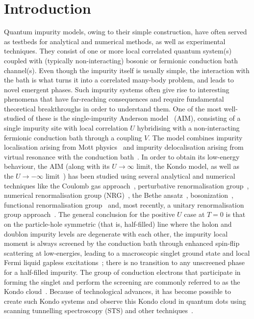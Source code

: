 \documentclass[reprint,superscriptaddress,floatfix]{revtex4-2}
\begin{document}

\section{Introduction}

Quantum impurity models, owing to their simple construction, have often served as testbeds for analytical and numerical methods, as well as experimental techniques.
They consist of one or more local correlated quantum system(s) coupled with (typically non-interacting) bosonic or fermionic conduction bath channel(s).
Even though the impurity itself is usually simple, the interaction with the bath is what turns it into a correlated many-body problem, and leads to novel emergent phases. Such impurity systems often give rise to interesting phenomena that have far-reaching consequences and require fundamental theoretical breakthroughs in order to understand them.
One of the most well-studied of these is the single-impurity Anderson model~\cite{anderson_1961,anderson_1978} (AIM), consisting of a single impurity site with local correlation \(U\) hybridising with a non-interacting fermionic conduction bath through a coupling \(V\).
The model combines impurity localisation arising from Mott physics~\cite{Mott_1949,vanvleck_1953} and impurity delocalisation arising from virtual resonance with the conduction bath~\cite{friedel_1956}.
In order to obtain its low-energy behaviour, the AIM (along with its \(U \to \infty\) limit, the Kondo model, as well as the \(U \to -\infty\) limit~\cite{schrieffer1966,taraphder_1991}) has been studied using several analytical and numerical techniques like the Coulomb gas approach~\cite{anderson1969exact,anderson1970exact}, perturbative renormalisation group~\cite{anderson1970,haldane1978scaling,jefferson_1977}, numerical renormalisation group (NRG)~\cite{wilson1975,hrk_wilson_1980}, the Bethe ansatz~\cite{andrei_1980,andreiKondoreview,Wiegmann_1981,tsvelickKondoreview}, bosonization~\cite{kotliar_1996,Duki_2011,borda_2008}, functional renormalisation group~\cite{streib_2013} and, most recently, a unitary renormalisation group approach~\cite{anirban_kondo}. 
The general conclusion for the positive \(U\) case at \(T=0\) is that on the particle-hole symmetric (that is, half-filled) line where the holon and doublon impurity levels are degenerate with each other, the impurity local moment is always screened by the conduction bath through enhanced spin-flip scattering at low-energies, leading to a macroscopic singlet ground state and local Fermi liquid gapless excitations~\cite{nozaki2012,mora_2015}; there is no transition to any unscreened phase for a half-filled impurity. The group of conduction electrons that participate in forming the singlet and perform the screening are commonly referred to as the Kondo cloud~\cite{sorensen_erik_affleck_1996,affleck_ian_2001,simon_pascal_2003,martin2010,martin2019}. Because of technological advances, it has become possible to create such Kondo systems and observe this Kondo cloud in quantum dots using scanning tunnelling spectroscopy (STS) and other techniques~\cite{Goldhaber-Gordon1998,Cronenwett1998,Schmid_Weis1998,pustilnik_glazman_2004,Borzenets2020,neel_berndt_2008,Zhao2005}.
\end{document}
